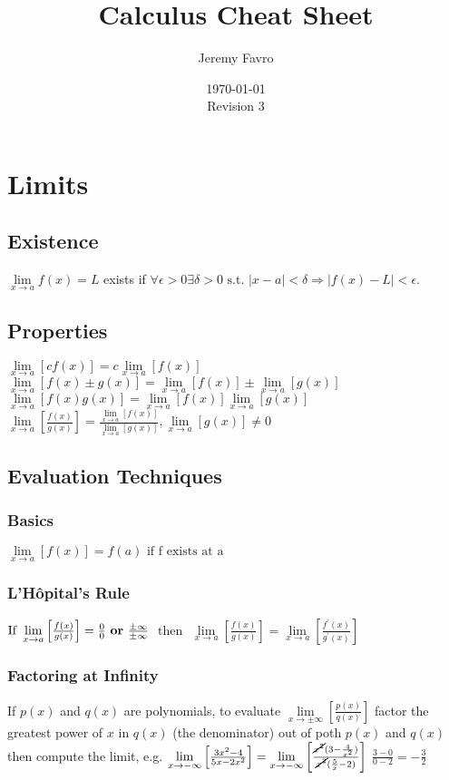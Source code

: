 \documentclass[10pt,landscape,letterpaper]{cheatsheet}
\title{Calculus Cheat Sheet}
\author{Jeremy Favro}
\date{\today\\Revision 3}
\begin{document}
\maketitle

\section*{Limits}
\subsection*{Existence}
$\lim\limits_{x\to a}f(x)=L $ exists if $\forall \epsilon > 0 \exists \delta > 0 \text{ s.t. } \left\lvert x-a \right\rvert < \delta \Rightarrow \left\lvert f(x) - L \right\rvert < \epsilon $.
\subsection*{Properties}
$ \lim\limits_{x\to a}[cf(x)]=c\lim\limits_{x\to a}[f(x)] $
$ \lim\limits_{x\to a}[f(x) \pm g(x)]=\lim\limits_{x\to a}[f(x)] \pm \lim\limits_{x\to a}[g(x)] $
$ \lim\limits_{x\to a}[f(x)g(x)]=\lim\limits_{x\to a}[f(x)]\lim\limits_{x\to a}[g(x)] $
$ \lim\limits_{x\to a}\left[\frac{f(x)}{g(x)}\right]=\frac{\lim\limits_{x\to a}[f(x)]}{\lim\limits_{x\to a}[g(x)]}, \lim\limits_{x\to a}[g(x)] \neq 0 $
\subsection*{Evaluation Techniques}

\subsubsection*{Basics}
$ \lim\limits_{x\to a}\left[f(x)\right]=f(a) \text{ if f exists at a } $

\subsubsection*{L'H\^opital's Rule}
$ \text{If } \lim\limits_{x\to a}\left[\frac{f(x)}{g(x)}\right]=\frac{0}{0} \text { \textbf{or} } \frac{\pm \infty}{\pm \infty}$
$ \text{ then } $
$ \lim\limits_{x\to a}\left[\frac{f(x)}{g(x)}\right]=\lim\limits_{x\to a}\left[\frac{f^{\prime}(x)}{g^{\prime}(x)}\right] $

\subsubsection*{Factoring at Infinity}
If $p(x)$ and $q(x)$ are polynomials, to evaluate $\lim\limits_{x\to \pm \infty}\left[\frac{p(x)}{q(x)}\right]$ factor the greatest power of $x$ in $q(x)$ (the denominator) out of poth $p(x)$ and $q(x)$ then compute the limit, e.g.
$ \lim\limits_{x\to -\infty}\left[\frac{3x^2-4}{5x-2x^2}\right]=\lim\limits_{x\to -\infty}\left[\frac{\cancel{x^2}(3-\frac{4}{x^2})}{\cancel{x^2}(\frac{5}{x}-2)}\right]$
$ \frac{3-0}{0-2} = -\frac{3}{2} $
\end{document}
